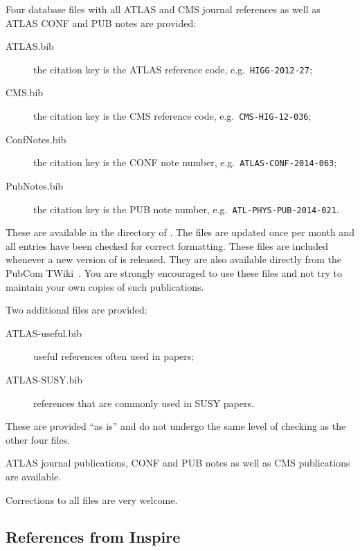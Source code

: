 \documentclass[REPORT=false, UKenglish]{atlasdoc}
\begin{document}
Four database files with all ATLAS and CMS journal references as well as
ATLAS CONF and PUB notes are provided:
\begin{description}
\item[ATLAS.bib] the citation key is the ATLAS reference code, e.g.\ \texttt{HIGG-2012-27};
\item[CMS.bib] the citation key is the CMS reference code, e.g.\ \texttt{CMS-HIG-12-036};
\item[ConfNotes.bib] the citation key is the CONF note number, e.g.\ \texttt{ATLAS-CONF-2014-063};
\item[PubNotes.bib] the citation key is the PUB note number, e.g.\ \texttt{ATL-PHYS-PUB-2014-021}.
\end{description}
These are available in the directory  of .
The files are updated once per month and all entries have been checked for correct formatting.
These files are included whenever a new version of  is released.
They are also available directly from the PubCom TWiki~\cite{pubcom-refs}.
You are strongly encouraged to use these files and not try to maintain your own copies of
such publications.

Two additional files are provided:
\begin{description}
  \item[ATLAS-useful.bib] useful references often used in papers;
  \item[ATLAS-SUSY.bib] references that are commonly used in SUSY papers.
\end{description}
These are provided \enquote{as is} and do not undergo the same level of checking as the other four files.

 ATLAS journal publications, CONF and PUB notes as well as
CMS publications are available.

Corrections to all files are very welcome.

\subsection{References from Inspire}
\label{sc:inquire}
\end{document}
